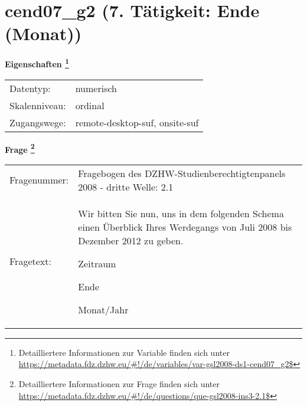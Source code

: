 
    \setcounter{footnote}{0}

    \vspace*{-1.8cm}
	\section{cend07\_g2 (7. Tätigkeit: Ende (Monat))}
	\label{section:cend07_g2}



    \vspace*{0.5cm}
    \noindent\textbf{Eigenschaften
	\footnote{Detailliertere Informationen zur Variable finden sich unter
		\url{https://metadata.fdz.dzhw.eu/\#!/de/variables/var-gsl2008-ds1-cend07_g2$}}}\\
	\begin{tabularx}{\hsize}{@{}lX}
	Datentyp: & numerisch \\
	Skalenniveau: & ordinal \\
	Zugangswege: &
	  remote-desktop-suf, 
	  onsite-suf
 \\
    \end{tabularx}



				\vspace*{0.5cm}
                \noindent\textbf{Frage
	                \footnote{Detailliertere Informationen zur Frage finden sich unter
		              \url{https://metadata.fdz.dzhw.eu/\#!/de/questions/que-gsl2008-ins3-2.1$}}}\\
				\begin{tabularx}{\hsize}{@{}lX}
					Fragenummer: &
					  Fragebogen des DZHW-Studienberechtigtenpanels 2008 - dritte Welle:
					  2.1
 \\
					Fragetext: & Wir bitten Sie nun, uns in dem folgenden Schema einen Überblick Ihres Werdegangs von Juli 2008 bis Dezember 2012 zu geben.\par  Zeitraum\par  Ende\par  Monat/Jahr \\
				\end{tabularx}





